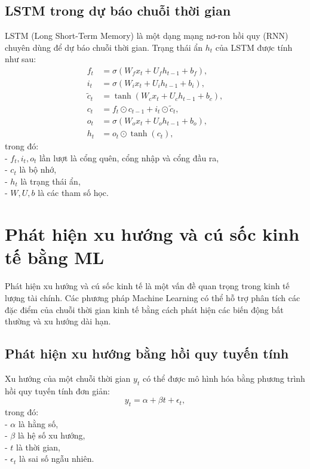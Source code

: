 \subsection{LSTM trong dự báo chuỗi thời gian}
LSTM (Long Short-Term Memory) là một dạng mạng nơ-ron hồi quy (RNN) chuyên dùng để dự báo chuỗi thời gian. Trạng thái ẩn $h_t$ của LSTM được tính như sau:
\begin{align}
    f_t &= \sigma(W_f x_t + U_f h_{t-1} + b_f), \\
    i_t &= \sigma(W_i x_t + U_i h_{t-1} + b_i), \\
    \tilde{c}_t &= \tanh(W_c x_t + U_c h_{t-1} + b_c), \\
    c_t &= f_t \odot c_{t-1} + i_t \odot \tilde{c}_t, \\
    o_t &= \sigma(W_o x_t + U_o h_{t-1} + b_o), \\
    h_t &= o_t \odot \tanh(c_t),
\end{align}
trong đó: \\ 
- $f_t, i_t, o_t$ lần lượt là cổng quên, cổng nhập và cổng đầu ra, \\
- $c_t$ là bộ nhớ, \\
- $h_t$ là trạng thái ẩn, \\
- $W, U, b$ là các tham số học.



\section{Phát hiện xu hướng và cú sốc kinh tế bằng ML}
Phát hiện xu hướng và cú sốc kinh tế là một vấn đề quan trọng trong kinh tế lượng tài chính. Các phương pháp Machine Learning có thể hỗ trợ phân tích các đặc điểm của chuỗi thời gian kinh tế bằng cách phát hiện các biến động bất thường và xu hướng dài hạn.

\subsection{Phát hiện xu hướng bằng hồi quy tuyến tính}
Xu hướng của một chuỗi thời gian $y_t$ có thể được mô hình hóa bằng phương trình hồi quy tuyến tính đơn giản:
\begin{equation}
    y_t = \alpha + \beta t + \epsilon_t,
\end{equation}
trong đó: \\
- $\alpha$ là hằng số, \\
- $\beta$ là hệ số xu hướng, \\
- $t$ là thời gian, \\
- $\epsilon_t$ là sai số ngẫu nhiên.


